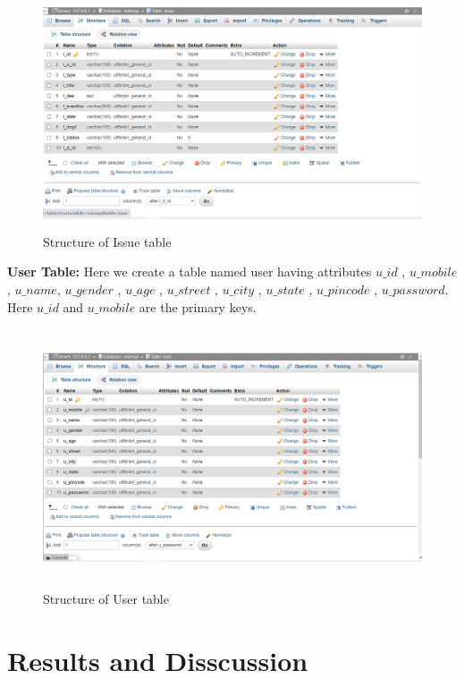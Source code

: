 \documentclass[12pt,a4paper]{report}
\begin{document}
\begin{figure}[hbtp]
\centering
\includegraphics[width=6.4in,height=2.7in]{fi.png}
\caption{Structure of Issue table}
\end{figure}
\vspace{2in}
\noindent \textbf{User Table:}
Here we create a table named user having attributes $u\_id$ , $u\_mobile$ , $u\_name$, $u\_gender$ , $u\_age$ , $u\_street$ , $u\_city$ , $u\_state$ , $u\_pincode$ , $u\_password$. Here $u\_id$ and $u\_mobile$  are the primary keys.
\begin{figure}[hbtp]
\centering
\includegraphics[width=6.4in,height=3in]{fu.png}
\caption{Structure of User table}
\end{figure}
\vspace{2.50in}

\chapter{Results and Disscussion}
\end{document}
